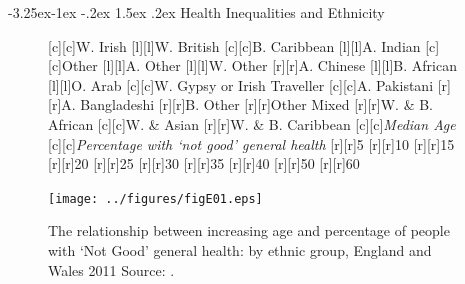 \documentclass[11 pt, a4paper]{report}
\makeatletter
\renewcommand\subsection{\@startsection{subsection}{2}{\z@}%
                                     {-3.25ex\@plus -1ex \@minus -.2ex}%
                                     {1.5ex \@plus .2ex}%
    								{\large\scshape}}
\makeatother
\begin{document}
\subsection{Health Inequalities and Ethnicity}
\begin{figure}[hbtp!]
[c][c]{\tiny{W. Irish}}
[l][l]{\tiny{W. British}}
[c][c]{\tiny{B. Caribbean}}
[l][l]{\tiny{A. Indian}}
[c][c]{\tiny{Other}}
[l][l]{\tiny{A. Other}}
[l][l]{\tiny{W. Other}}
[r][r]{\tiny{A. Chinese}}
[l][l]{\tiny{B. African}}
[l][l]{\tiny{O. Arab}}
[c][c]{\tiny{W. Gypsy or Irish Traveller}}
[c][c]{\tiny{A. Pakistani}}
[r][r]{\tiny{A. Bangladeshi}}
[r][r]{\tiny{B. Other}}
[r][r]{\tiny{Other Mixed}}
[r][r]{\tiny{W. \& B. African}}
[c][c]{\tiny{W. \& Asian}}
[r][r]{\tiny{W. \& B. Caribbean}}
[c][c]{\small{\emph{Median Age}}}
[c][c]{\small{\emph{Percentage with `not good' general health}}}
[r][r]{\scriptsize{5}}
[r][r]{\scriptsize{10}}
[r][r]{\scriptsize{15}}
[r][r]{\scriptsize{20}}
[r][r]{\scriptsize{25}}
[r][r]{\scriptsize{30}}
[r][r]{\scriptsize{35}}
[r][r]{\scriptsize{40}}
[r][r]{\scriptsize{50}}
[r][r]{\scriptsize{60}}

\texttt{[image: ../figures/figE01.eps]}
\caption{The relationship between increasing age and percentage of people with ‘Not Good’ general health: by ethnic group, England and Wales   2011 Source: \cite{ONS2013}.
}\label{Fig:N10}%
\end{figure}
\end{document}
